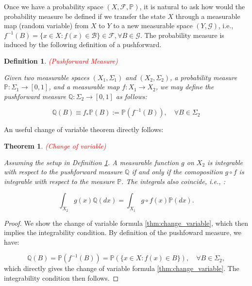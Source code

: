 \documentclass{article}
\newtheorem{definition}{Definition}
\newtheorem{theorem}{Theorem}
\begin{document}
Once we have a probability space $(X,\mathcal{F},\mathbb{P})$, it is natural to ask how would the probability measure be defined if we transfer the state $X$ through a measurable map (random variable) from $X$ to $Y$ to a new measurable space $(Y,\mathcal{G})$, i.e., $f^{-1}(B)=\{x\in X: f(x)\in\mathcal{B}\}\in\mathcal{F}, \forall B\in\mathcal{G}$. The probability measure is induced by the following definition of a pushforward. 

\begin{definition} \label{def:pushforward} \textcolor{red}{(Pushforward Measure)}

Given two measurable spaces $(X_1, \Sigma_1)$ and $(X_2,\Sigma_2)$, a probability measure $\mathbb{P}:\Sigma_1\rightarrow[0,1]$, and a measurable map $f:X_1\rightarrow X_2$, we may define the pushforward measure $\mathbb{Q}:\Sigma_2\rightarrow[0,1]$ as follows:

\begin{equation*}
\mathbb{Q}(B)\equiv f_*\mathbb{P}(B):=\mathbb{P}(f^{-1}(B)), \quad \forall B\in\Sigma_2
\end{equation*}

\end{definition}

An useful change of variable theorem directly follows:

\begin{theorem} \textcolor{red}{(Change of variable)}

Assuming the setup in Definition \ref{def:pushforward}. A measurable function $g$ on $X_2$ is integrable with respect to the pushforward measure $\mathbb{Q}$ if and only if the comoposition $g\circ f$ is integrable with respect to the measure $\mathbb{P}$. The integrals also coincide, i.e., :

\begin{equation} \label{thm:change_variable}
\int_{X_2}g(x)\mathbb{Q}(dx)=\int_{X_1}g\circ f(x) \mathbb{P}(dx).
\end{equation}

\end{theorem}

\begin{proof}
We show the change of variable formula \eqref{thm:change_variable}, which then implies the integrability condition. By definition of the pushfoward measure, we have:

\begin{equation*}
\mathbb{Q}(B)=\mathbb{P}(f^{-1}(B))=\mathbb{P}(\{x\in X: f(x)\in B\}), \quad \forall B\in\Sigma_2,
\end{equation*}
which directly gives the change of variable formula \eqref{thm:change_variable}. The integrability condition then follows.
\end{proof}
\end{document}
